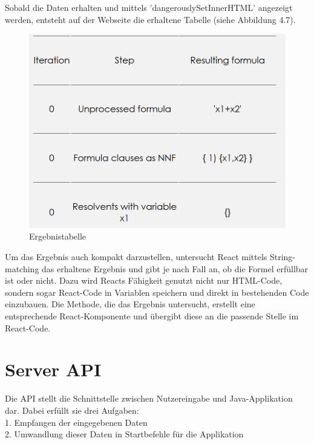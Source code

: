 Sobald die Daten erhalten und mittels 'dangerouslySetInnerHTML' angezeigt werden, entsteht auf der Webseite die erhaltene Tabelle (siehe Abbildung 4.7).\\
\begin{figure}[H]
     \centerline{\includegraphics[width=14cm]{../Abbildungen/steps.png}}
  \caption{Ergebnistabelle \cite{eig}}
  \label{fig1_1}
\end{figure}
\noindent Um das Ergebnis auch kompakt darzustellen, untersucht React mittels String-matching das erhaltene Ergebnis und gibt je nach Fall an, ob die Formel erfüllbar ist oder nicht. Dazu wird Reacts Fähigkeit genutzt nicht nur HTML-Code, sondern sogar React-Code in Variablen speichern und direkt in bestehenden Code einzubauen. Die Methode, die das Ergebnis untersucht, erstellt eine entsprechende React-Komponente und übergibt diese an die passende Stelle im React-Code. \\
\clearpage
\section{Server API}
Die API stellt die Schnittstelle zwischen Nutzereingabe und Java-Applikation dar. Dabei erfüllt sie drei Aufgaben: \\

1. Empfangen der eingegebenen Daten \\ 

2. Umwandlung dieser Daten in Startbefehle für die Applikation\\

